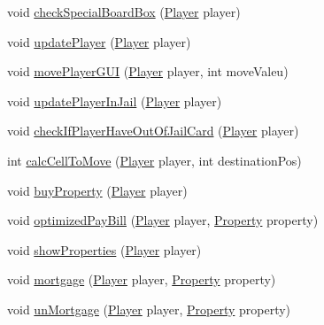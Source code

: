 \begin{DoxyCompactItemize}
\item 
void \hyperlink{class_monopoly_1_1_logic_1_1_game_a44fa0ecfe376ed217a51031210942d70}{check\+Special\+Board\+Box} (\hyperlink{class_monopoly_1_1_logic_1_1_player}{Player} player)
\item 
void \hyperlink{class_monopoly_1_1_logic_1_1_game_a971fdb273d8d9a701bb7790c9cd83b39}{update\+Player} (\hyperlink{class_monopoly_1_1_logic_1_1_player}{Player} player)
\item 
void \hyperlink{class_monopoly_1_1_logic_1_1_game_a54d5653cfde38bb733ec4e6152353d73}{move\+Player\+G\+UI} (\hyperlink{class_monopoly_1_1_logic_1_1_player}{Player} player, int move\+Valeu)
\item 
void \hyperlink{class_monopoly_1_1_logic_1_1_game_a04e53f951804adcbcf299ff9e2848b3c}{update\+Player\+In\+Jail} (\hyperlink{class_monopoly_1_1_logic_1_1_player}{Player} player)
\item 
void \hyperlink{class_monopoly_1_1_logic_1_1_game_aedd3da09478a78baec3b3b8dc91a3e88}{check\+If\+Player\+Have\+Out\+Of\+Jail\+Card} (\hyperlink{class_monopoly_1_1_logic_1_1_player}{Player} player)
\item 
int \hyperlink{class_monopoly_1_1_logic_1_1_game_ab80a078ce9cc880d5f0cd341b6e244f2}{calc\+Cell\+To\+Move} (\hyperlink{class_monopoly_1_1_logic_1_1_player}{Player} player, int destination\+Pos)
\item 
void \hyperlink{class_monopoly_1_1_logic_1_1_game_a762472efc27ce244e217ed4135691cd9}{buy\+Property} (\hyperlink{class_monopoly_1_1_logic_1_1_player}{Player} player)
\item 
void \hyperlink{class_monopoly_1_1_logic_1_1_game_af1e3ab6c22df3aec8e5e70b14a72dc14}{optimized\+Pay\+Bill} (\hyperlink{class_monopoly_1_1_logic_1_1_player}{Player} player, \hyperlink{class_monopoly_1_1_logic_1_1_property}{Property} property)
\item 
void \hyperlink{class_monopoly_1_1_logic_1_1_game_a789b698353bfb93d971523905b28060a}{show\+Properties} (\hyperlink{class_monopoly_1_1_logic_1_1_player}{Player} player)
\item 
void \hyperlink{class_monopoly_1_1_logic_1_1_game_addf55b2a5c94e3de1ddfccd02a93258c}{mortgage} (\hyperlink{class_monopoly_1_1_logic_1_1_player}{Player} player, \hyperlink{class_monopoly_1_1_logic_1_1_property}{Property} property)
\item 
void \hyperlink{class_monopoly_1_1_logic_1_1_game_aee26d88362845a791b854afedc94d508}{un\+Mortgage} (\hyperlink{class_monopoly_1_1_logic_1_1_player}{Player} player, \hyperlink{class_monopoly_1_1_logic_1_1_property}{Property} property)

\end{DoxyCompactItemize}
